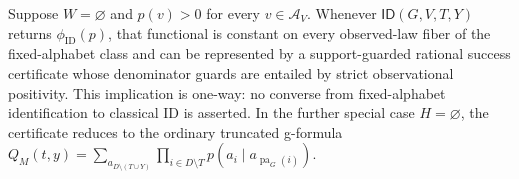 Suppose \(W=\varnothing\) and \(p(v)>0\) for every \(v\in\mathcal A_V\). Whenever \(\mathsf{ID}(G,V,T,Y)\) returns \(\phi_{\mathrm{ID}}(p)\), that functional is constant on every observed-law fiber of the fixed-alphabet class and can be represented by a support-guarded rational success certificate whose denominator guards are entailed by strict observational positivity. This implication is one-way: no converse from fixed-alphabet identification to classical ID is asserted. In the further special case \(H=\varnothing\), the certificate reduces to the ordinary truncated g-formula \(Q_M(t,y)=\sum_{a_{D\setminus(T\cup Y)}}\prod_{i\in D\setminus T}p(a_i\mid a_{\operatorname{pa}_G(i)})\).